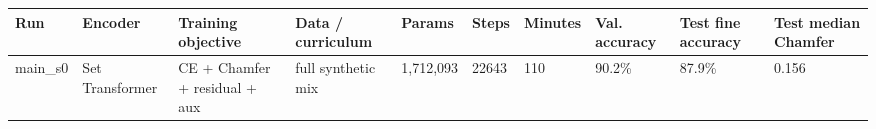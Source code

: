 \scriptsize
\begin{tabular}{llllllllll}
\toprule
\textbf{Run} & \textbf{Encoder} & \textbf{Training objective} & \textbf{Data / curriculum} & \textbf{Params} & \textbf{Steps} & \textbf{Minutes} & \textbf{Val. accuracy} & \textbf{Test fine accuracy} & \textbf{Test median Chamfer} \\
\midrule
main\_s0 & Set Transformer & CE + Chamfer + residual + aux & full synthetic mix & 1,712,093 & 22643 & 110 & 90.2\% & 87.9\% & 0.156 \\
\bottomrule
\end{tabular}
